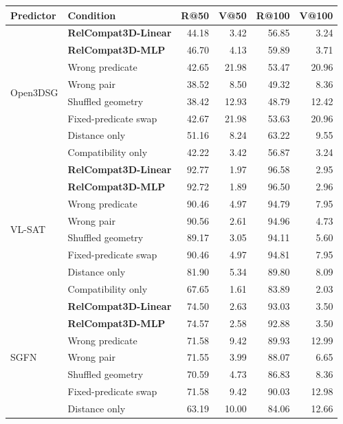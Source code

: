 \begin{table}[t]
    \centering
    {\small
    \setlength{\tabcolsep}{1.5pt}
    \begin{tabular}{@{}llrrrr@{}}
    \toprule
    Predictor & Condition & R@50 & V@50 & R@100 & V@100 \\
    \midrule
    \multirow{8}{*}{Open3DSG} & \textbf{RelCompat3D-Linear} & 44.18 & 3.42 & 56.85 & 3.24 \\
    & \textbf{RelCompat3D-MLP} & 46.70 & 4.13 & 59.89 & 3.71 \\
    & Wrong predicate & 42.65 & 21.98 & 53.47 & 20.96 \\
    & Wrong pair & 38.52 & 8.50 & 49.32 & 8.36 \\
    & Shuffled geometry & 38.42 & 12.93 & 48.79 & 12.42 \\
    & Fixed-predicate swap & 42.67 & 21.98 & 53.63 & 20.96 \\
    & Distance only & 51.16 & 8.24 & 63.22 & 9.55 \\
    & Compatibility only & 42.22 & 3.42 & 56.87 & 3.24 \\
    \midrule
    \multirow{8}{*}{VL-SAT} & \textbf{RelCompat3D-Linear} & 92.77 & 1.97 & 96.58 & 2.95 \\
    & \textbf{RelCompat3D-MLP} & 92.72 & 1.89 & 96.50 & 2.96 \\
    & Wrong predicate & 90.46 & 4.97 & 94.79 & 7.95 \\
    & Wrong pair & 90.56 & 2.61 & 94.96 & 4.73 \\
    & Shuffled geometry & 89.17 & 3.05 & 94.11 & 5.60 \\
    & Fixed-predicate swap & 90.46 & 4.97 & 94.81 & 7.95 \\
    & Distance only & 81.90 & 5.34 & 89.80 & 8.09 \\
    & Compatibility only & 67.65 & 1.61 & 83.89 & 2.03 \\
    \midrule
    \multirow{8}{*}{SGFN} & \textbf{RelCompat3D-Linear} & 74.50 & 2.63 & 93.03 & 3.50 \\
    & \textbf{RelCompat3D-MLP} & 74.57 & 2.58 & 92.88 & 3.50 \\
    & Wrong predicate & 71.58 & 9.42 & 89.93 & 12.99 \\
    & Wrong pair & 71.55 & 3.99 & 88.07 & 6.65 \\
    & Shuffled geometry & 70.59 & 4.73 & 86.83 & 8.36 \\
    & Fixed-predicate swap & 71.58 & 9.42 & 90.03 & 12.98 \\
    & Distance only & 63.19 & 10.00 & 84.06 & 12.66 \\

\end{tabular}}
\end{table}
